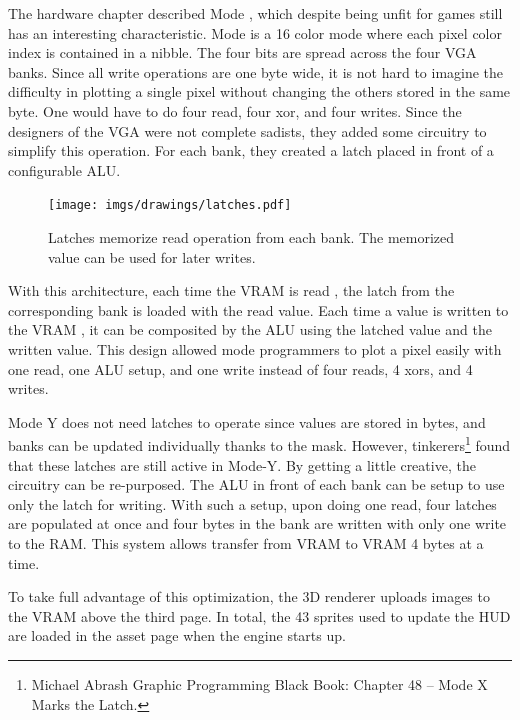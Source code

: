 The hardware chapter described Mode , which despite being unfit for games still has an interesting characteristic. Mode  is a 16 color mode where each pixel color index is contained in a nibble. The four bits are spread across the four VGA banks. Since all write operations are one byte wide, it is not hard to imagine the difficulty in plotting a single pixel without changing the others stored in the same byte. One would have to do four read, four xor, and four writes. Since the designers of the VGA were not complete sadists, they added some circuitry to simplify this operation. For each bank, they created a latch placed in front of a configurable ALU.\\
\par
 \begin{figure}[H]
\centering
 \texttt{[image: imgs/drawings/latches.pdf]}
 \caption{Latches memorize read operation from each bank. The memorized value can be used for later writes.}
 \end{figure}
With this architecture, each time the VRAM is read , the latch from the corresponding bank is loaded with the read value. Each time a value is written to the VRAM , it can be composited by the ALU using the latched value and the written value. This design allowed mode  programmers to plot a pixel easily with one read, one ALU setup, and one write instead of four reads, 4 xors, and 4 writes.\\
\par
Mode Y does not need latches to operate since values are stored in bytes, and banks can be updated individually thanks to the mask. However, tinkerers\footnote{Michael Abrash Graphic Programming Black Book: Chapter 48 -- Mode X Marks the Latch.} found that these latches are still active in  Mode-Y. By getting a little creative, the circuitry can be re-purposed. The ALU in front of each bank can be setup to use only the latch for writing. With such a setup, upon doing one read, four latches are populated at once and four bytes in the bank are written with only one write to the RAM. This system allows transfer from VRAM to VRAM 4 bytes at a time.\\
\par
To take full advantage of this optimization, the 3D renderer uploads images to the VRAM above the third page. In total, the 43 sprites used to update the HUD are loaded in the asset page when the engine starts up.\\





